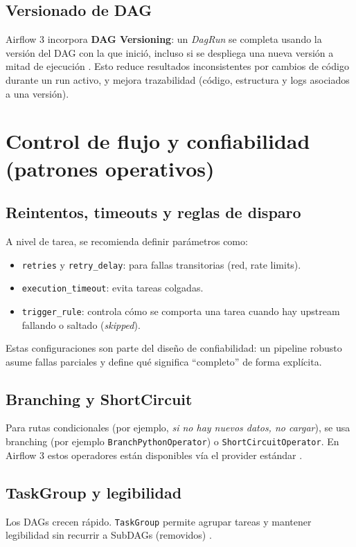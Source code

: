 \subsection{Versionado de DAG}
Airflow 3 incorpora \textbf{DAG Versioning}: un \textit{DagRun} se completa usando la versión del DAG con la que inició, incluso si se despliega una nueva versión a mitad de ejecución \cite{airflow_blog_3_ga}. Esto reduce resultados inconsistentes por cambios de código durante un run activo, y mejora trazabilidad (código, estructura y logs asociados a una versión).

\section{Control de flujo y confiabilidad (patrones operativos)}
\subsection{Reintentos, timeouts y reglas de disparo}
A nivel de tarea, se recomienda definir parámetros como:
\begin{itemize}[leftmargin=*]
  \item \texttt{retries} y \texttt{retry\_delay}: para fallas transitorias (red, rate limits).
  \item \texttt{execution\_timeout}: evita tareas colgadas.
  \item \texttt{trigger\_rule}: controla cómo se comporta una tarea cuando hay upstream fallando o saltado (\textit{skipped}).
\end{itemize}
Estas configuraciones son parte del diseño de confiabilidad: un pipeline robusto asume fallas parciales y define qué significa ``completo'' de forma explícita.

\subsection{Branching y ShortCircuit}
Para rutas condicionales (por ejemplo, \textit{si no hay nuevos datos, no cargar}), se usa branching (por ejemplo \texttt{BranchPythonOperator}) o \texttt{ShortCircuitOperator}. En Airflow 3 estos operadores están disponibles vía el provider estándar \cite{airflow_standard_provider_python_api}.

\subsection{TaskGroup y legibilidad}
Los DAGs crecen rápido. \texttt{TaskGroup} permite agrupar tareas y mantener legibilidad sin recurrir a SubDAGs (removidos) \cite{airflow_upgrade_3_breaking,airflow_public_interface}.


